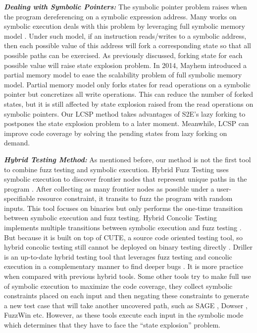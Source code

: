 \noindent\textit{\textbf{Dealing with Symbolic Pointers:}}
The symbolic pointer problem raises when the program dereferencing on a symbolic expression address. 
 Many works on symbolic execution deals with this problem by leveraging full symbolic memory model \cite{song2008bitblaze, thakur2010directed, brumley2011bap, trtik2014symbolic}. Under such model, if an instruction reads/writes to a symbolic address, then each possible value of this address will fork a corresponding state so that all possible paths can be exercised.
  As previously discussed, forking state for each possible value will raise state explosion problem. 
 In 2014, Mayhem \cite{cha2012unleashing} introduced a partial memory model to ease the scalability problem of full symbolic memory model. 
  Partial memory model only forks states for read operations on a symbolic pointer but concretizes all write operations. This can reduce the number of forked states, but it is still affected by state explosion raised from the read operations on symbolic pointers.
 Our LCSP method takes advantages of S2E's lazy forking to postpones the state explosion problem to a later moment. 
  Meanwhile, LCSP can improve code coverage by solving the pending states from lazy forking on demand.

\noindent\textit{\textbf{Hybrid Testing Method:}}
As mentioned before, our method is not the first tool to combine fuzz testing and symbolic execution. Hybrid Fuzz Testing uses symbolic execution to discover frontier nodes that represent unique paths in the program \cite{pak2012hybrid}. After collecting as many frontier nodes as possible under a user-specifiable resource constraint, it transits to fuzz the program with random inputs. This tool focuses on binaries but only performs the one-time transition between symbolic execution and fuzz testing. Hybrid Concolic Testing implements multiple transitions between symbolic execution and fuzz testing \cite{majumdar2007hybrid}. But because it is built on top of CUTE, a source code oriented testing tool, so hybrid concolic testing still cannot be deployed on binary testing directly \cite{sen2005cute}. Driller is an up-to-date hybrid testing tool that leverages fuzz testing and concolic execution in a complementary manner to find deeper bugs \cite{stephens2016driller}. It is more practice when compared with previous hybrid tools. Some other tools try to make full use of symbolic execution to maximize the code coverage, they collect symbolic constraints placed on each input and then negating these constraints to generate a new test case that will take another uncovered path, such as SAGE \cite{godefroid2012sage}, Dowser \cite{haller2013dowsing}, FuzzWin \cite{online:fuzzwin} etc. However, as these tools execute each input in the symbolic mode which determines that they have to face the ``state explosion'' problem. 